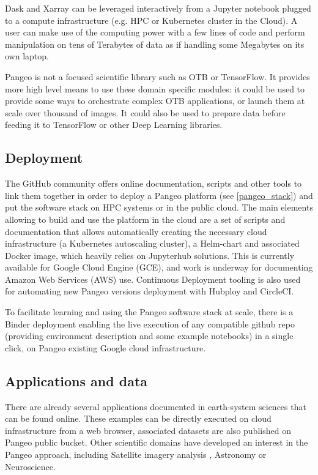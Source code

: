 \documentclass{article}
\begin{document}
Dask and Xarray can be leveraged interactively from a Jupyter notebook plugged to
a compute infrastructure (e.g. HPC or Kubernetes cluster in the Cloud). A user
can make use of the computing power with a few lines of code and perform
manipulation on tens of Terabytes of data as if handling some Megabytes on its
own laptop.

Pangeo is not a focused scientific library such as OTB or TensorFlow.
It provides more high level means to use these domain specific modules: 
it could be used to provide some ways to orchestrate complex OTB applications,
or launch them at scale over thousand of images. It could also be used to prepare 
data before feeding it to TensorFlow or other Deep Learning libraries.


\subsection{Deployment}
\label{ssec:deployment}

The GitHub community offers online documentation, scripts and other tools to link them together in order to deploy a Pangeo platform (see \ref{pangeo_stack}) and put the software stack on HPC systems or in the public cloud. The main elements allowing to build and use the platform in the cloud are a set of scripts and documentation that allows automatically creating the necessary cloud infrastructure (a Kubernetes autoscaling cluster), a Helm-chart and associated Docker image, which heavily relies on Jupyterhub solutions. This is currently available for Google Cloud Engine (GCE), and work is underway for documenting Amazon Web Services (AWS) use. Continuous Deployment tooling is also used for automating new Pangeo versions deployment with Hubploy and CircleCI.

To facilitate learning and using the Pangeo software stack at scale, there is a Binder deployment\cite{b8} enabling the live execution of any compatible github repo (providing environment description and some example notebooks) in a single click, on Pangeo existing Google cloud infrastructure.


\subsection{Applications and data}
\label{ssec:applications}

There are already several applications documented in earth-system sciences that can be found online\cite{b5}. These examples can be directly executed on cloud infrastructure from a web browser, associated datasets are also published on Pangeo public bucket. 
Other scientific domains have developed an interest in the Pangeo approach, including Satellite imagery analysis \cite{b6}, Astronomy or Neuroscience.
\end{document}
